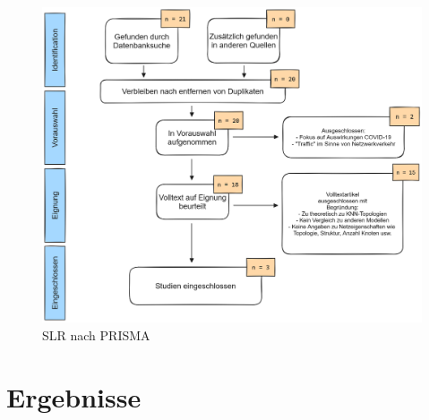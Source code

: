 \documentclass{scrartcl}
\begin{document}
\begin{figure}[h]
   \centering
   \caption{SLR nach PRISMA}
   \label{abb1}
   \includegraphics[scale=0.28]{Bilder/prisma-exported.png}
\end{figure}

\section{Ergebnisse}
\end{document}
